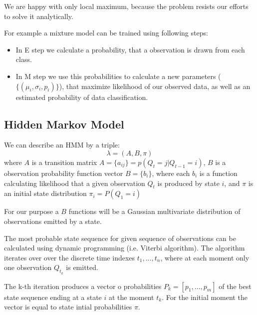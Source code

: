 \documentclass[12pt,a4paper,english]{article}
\begin{document}
We are happy with only local maximum, because the problem resists our efforts to solve it analytically. \newline


For example a mixture model can be trained using following steps: \newline
\begin{itemize}
    \item In E step we calculate a probability, that a observation is drawn from each class.
    \item In M step we use this probabilities to calculate a new parameters ($\{(\mu_i, \sigma_i, p_i)\}$), that maximize likelihood of our observed data, as well as an estimated probability of data classification.
\end{itemize}

\newpage
\subsection{Hidden Markov Model}

We can describe an HMM by a triple:
\begin{equation}
    \lambda=(A, B, \pi)
\end{equation}
 where $A$ is a transition matrix $A = \{ a_{ij} \} = p(Q_t=j | Q_{t-1}=i)$, \newline
 $B$ is a observation probability function vector $B = \{ b_i \}$, where each $b_i$ is a function calculating likelihood that a given observation $Q_t$  is produced by state $i$, \newline
 and $\pi$ is an initial state distribution  $\pi_i=P(Q_1=i)$ \newline

For our purpose a $B$ functions will be a Gaussian multivariate distribution of observations emitted by a state. \newline

The most probable state sequence for given sequence of observations can be calculated using dynamic programming (i.e. Viterbi algorithm). \newline
The algorithm iterates over over the discrete time indexes $t_1, ..., t_n$, where at each moment only one observation $Q_{t_k}$ is emitted. \newline

The k-th iteration produces a vector o probabilities $P_k=[p_1, ..., p_m]$ of the best state sequence ending at a state $i$ at the moment $t_k$.
For the initial moment the vector is equal to state intial probabilities $\pi$. \newline
\end{document}
